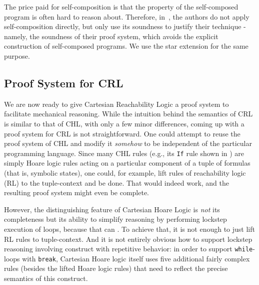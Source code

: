 The price paid for self-composition is that the property of the self-composed program is often hard to reason about.
Therefore, in~\cite{SousaD16}, the authors do not apply self-composition directly, but only use its soundness to justify
their technique - namely, the soundness of their proof system, which avoids the explicit construction
of self-composed programs.
We use the star extension for the same purpose.



\subsection{Proof System for CRL}
\label{sec:proof-system}

We are now ready to give Cartesian Reachability Logic a proof system to
facilitate mechanical reasoning.  While the intuition behind the semantics of
CRL is similar to that of CHL, with only a few minor differences, coming up
with a proof system for CRL is not straightforward.  One could attempt to reuse the proof
system of CHL and modify it \emph{somehow} to be independent of the particular
programming language.  Since many CHL rules (e.g., its \texttt{If} rule shown
in ) are simply Hoare logic rules acting on a particular
component of a tuple of formulas (that is, symbolic states), one could, for
example, lift rules of reachability logic (RL) to the tuple-context and be
done.  That would indeed work, and the resulting proof system might even be
complete.

However, the distinguishing feature of Cartesian Hoare Logic is \emph{not} its
completeness but its ability to simplify reasoning by performing lockstep
execution of loops, because that can .
To achieve that, it is not enough to 
just lift RL rules to tuple-context. And it is not entirely obvious how
to support lockstep reasoning involving construct with repetitive behavior: in
order to support \texttt{while}-loops with \texttt{break}, Cartesian Hoare logic itself uses
five additional fairly complex rules (besides the lifted Hoare logic rules) 
that need to reflect the precise semantics of this construct.


